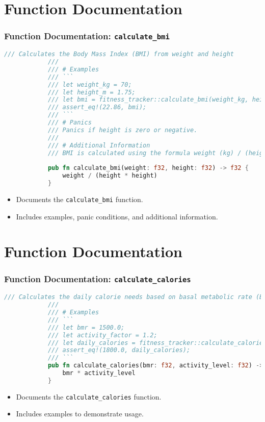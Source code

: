 \documentclass[aspectratio=169, table]{beamer}
\begin{document}
	\section{Function Documentation}
	\begin{frame}[fragile]
		\frametitle{Function Documentation: \texttt{calculate\_bmi}}
		\begin{lstlisting}[language=Rust]
			/// Calculates the Body Mass Index (BMI) from weight and height
			/// 
			/// # Examples
			/// ```  
			/// let weight_kg = 70;
			/// let height_m = 1.75;
			/// let bmi = fitness_tracker::calculate_bmi(weight_kg, height_m);
			/// assert_eq!(22.86, bmi); 
			/// ``` 
			/// # Panics
			/// Panics if height is zero or negative.
			/// 
			/// # Additional Information
			/// BMI is calculated using the formula weight (kg) / (height (m) * height (m)).
			
			pub fn calculate_bmi(weight: f32, height: f32) -> f32 {
				weight / (height * height)
			} 
		\end{lstlisting}
		\begin{itemize}
			\item Documents the \texttt{calculate\_bmi} function.
			\item Includes examples, panic conditions, and additional information.
		\end{itemize}
	\end{frame}
	
	\section{Function Documentation}
	\begin{frame}[fragile]
		\frametitle{Function Documentation: \texttt{calculate\_calories}}
		\begin{lstlisting}[language=Rust]
			/// Calculates the daily calorie needs based on basal metabolic rate (BMR) and activity level
			/// 
			/// # Examples
			/// ``` 
			/// let bmr = 1500.0;
			/// let activity_factor = 1.2;
			/// let daily_calories = fitness_tracker::calculate_calories(bmr, activity_factor);
			/// assert_eq!(1800.0, daily_calories); 
			/// ```  
			pub fn calculate_calories(bmr: f32, activity_level: f32) -> f32 {
				bmr * activity_level
			}
		\end{lstlisting}
		\begin{itemize}
			\item Documents the \texttt{calculate\_calories} function.
			\item Includes examples to demonstrate usage.
		\end{itemize}
	\end{frame}
	
\end{document}
